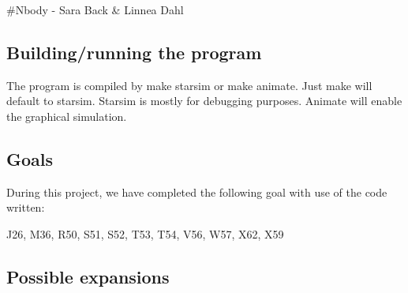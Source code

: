 \#\-Nbody -\/ Sara Back \& Linnea Dahl \subsection*{Building/running the program}

The program is compiled by make starsim or make animate. Just make will default to starsim. Starsim is mostly for debugging purposes. Animate will enable the graphical simulation.

\subsection*{Goals}

During this project, we have completed the following goal with use of the code written\-:

J26, M36, R50, S51, S52, T53, T54, V56, W57, X62, X59

\subsection*{Possible expansions}
